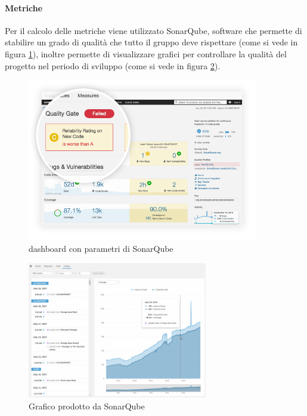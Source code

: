 			\paragraph{Metriche} \Spazio
			Per il calcolo delle metriche viene utilizzato SonarQube, software che permette di stabilire un grado di qualità che tutto il gruppo deve rispettare (come si vede in figura \ref{qualità}), inoltre permette di visualizzare grafici per controllare la qualità del progetto nel periodo di sviluppo (come si vede in figura \ref{graficobello}).
			\begin{figure}[h] 
				\centering 
				\includegraphics[width=0.9\textwidth]{images/enforce-quality-gate.png} 
				\caption{dashboard con parametri di SonarQube}
				\label{qualità}
			\end{figure}
		    \begin{figure}[h]
		    	\centering 
		    	\includegraphics[width=0.7\textwidth]{images/project-history2.png}
		    	\caption{Grafico prodotto da SonarQube}
		    	\label{graficobello} 
		    \end{figure}
	    
